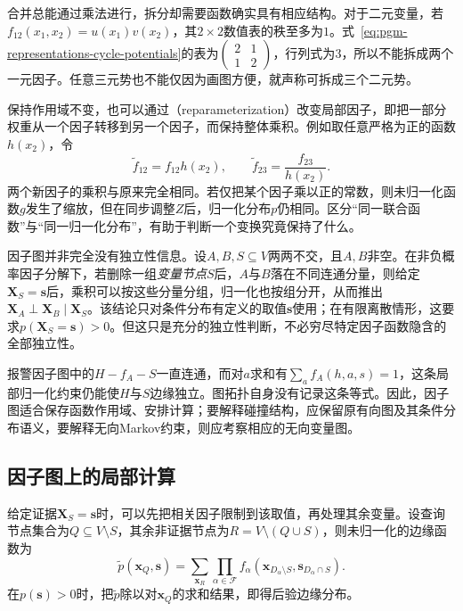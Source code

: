 合并总能通过乘法进行，拆分却需要函数确实具有相应结构。对于二元变量，若$f_{12}(x_1,x_2)=u(x_1)v(x_2)$，其$2\times2$数值表的秩至多为$1$。式~\eqref{eq:pgm-representations-cycle-potentials}的表为$\left(\begin{smallmatrix}2&1\\1&2\end{smallmatrix}\right)$，行列式为$3$，所以不能拆成两个一元因子。任意三元势也不能仅因为画图方便，就声称可拆成三个二元势。

保持作用域不变，也可以通过（reparameterization）改变局部因子，即把一部分权重从一个因子转移到另一个因子，而保持整体乘积。例如取任意严格为正的函数$h(x_2)$，令
\[
  \widetilde f_{12}=f_{12}h(x_2),\qquad
  \widetilde f_{23}=\frac{f_{23}}{h(x_2)}.
\]
两个新因子的乘积与原来完全相同。若仅把某个因子乘以正的常数，则未归一化函数$g$发生了缩放，但在同步调整$Z$后，归一化分布$p$仍相同。区分“同一联合函数”与“同一归一化分布”，有助于判断一个变换究竟保持了什么。

因子图并非完全没有独立性信息。设$A,B,S\subseteq V$两两不交，且$A,B$非空。在非负概率因子分解下，若删除一组\emph{变量节点}$S$后，$A$与$B$落在不同连通分量，则给定$\bm{X}_S=\bm{s}$后，乘积可以按这些分量分组，归一化也按组分开，从而推出$\bm{X}_A\perp\bm{X}_B\mid\bm{X}_S$。该结论只对条件分布有定义的取值$\bm{s}$使用；在有限离散情形，这要求$p(\bm{X}_S=\bm{s})>0$。但这只是充分的独立性判断，不必穷尽特定因子函数隐含的全部独立性。

报警因子图中的$H-f_A-S$一直连通，而对$a$求和有$\sum_a f_A(h,a,s)=1$，这条局部归一化约束仍能使$H$与$S$边缘独立。图拓扑自身没有记录这条等式。因此，因子图适合保存函数作用域、安排计算；要解释碰撞结构，应保留原有向图及其条件分布语义，要解释无向Markov约束，则应考察相应的无向变量图。

\subsection{因子图上的局部计算}
\label{sec:pgm-representations-local-computation}

给定证据$\bm{X}_S=\bm{s}$时，可以先把相关因子限制到该取值，再处理其余变量。设查询节点集合为$Q\subseteq V\setminus S$，其余非证据节点为$R=V\setminus(Q\cup S)$，则未归一化的边缘函数为
\begin{equation}
  \widetilde p(\bm{x}_Q,\bm{s})
  =\sum_{\bm{x}_R}
  \prod_{\alpha\in\mathcal{F}}
  f_\alpha(\bm{x}_{D_\alpha\setminus S},\bm{s}_{D_\alpha\cap S}).
  \label{eq:pgm-representations-marginal-query}
\end{equation}
在$p(\bm{s})>0$时，把$\widetilde p$除以对$\bm{x}_Q$的求和结果，即得后验边缘分布。


